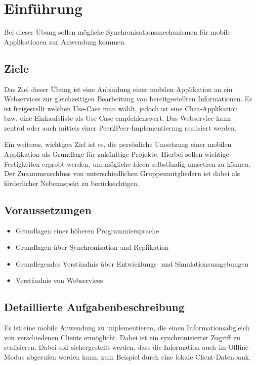 
\section{Einführung}

Bei dieser Übung sollen mögliche Synchronisationsmechanismen für mobile Applikationen zur Anwendung kommen.

\subsection{Ziele}
Das Ziel dieser Übung ist eine Anbindung einer mobilen Applikation an ein Webservices zur gleichzeitigen Bearbeitung von bereitgestellten Informationen. Es ist freigestellt welchen Use-Case man wählt, jedoch ist eine Chat-Applikation bzw. eine Einkaufsliste als Use-Case empfehlenswert. Das Webservice kann zentral oder auch mittels einer Peer2Peer-Implementierung realisiert werden.

Ein weiteres, wichtiges Ziel ist es, die persönliche Umsetzung einer mobilen Applikation als Grundlage für zukünftige Projekte. Hierbei sollen wichtige Fertigkeiten erprobt werden, um mögliche Ideen selbständig umsetzen zu können. Der Zusammenschluss von unterschiedlichen Gruppenmitgliedern ist dabei als förderlicher Nebenaspekt zu berücksichtigen.

\subsection{Voraussetzungen}

\begin{itemize}
    \item Grundlagen einer höheren Programmiersprache
    \item Grundlagen über Synchronisation und Replikation
    \item Grundlegendes Verständnis über Entwicklungs- und Simulationsumgebungen
    \item Verständnis von Webservices
\end{itemize}

\subsection{Detaillierte Aufgabenbeschreibung}

Es ist eine mobile Anwendung zu implementieren, die einen Informationsabgleich von verschiedenen Clients ermöglicht. Dabei ist ein synchronisierter Zugriff zu realisieren. Dabei soll sichergestellt werden, dass die Information auch im Offline-Modus abgerufen werden kann, zum Beispiel durch eine lokale Client-Datenbank.

